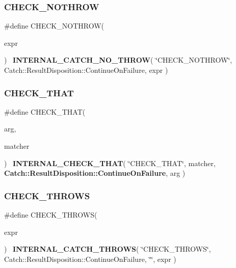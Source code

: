 \mbox{\label{catch_8hpp_a6c1cf3811206fc694cbba31364b61d87}} 
\subsubsection{C\+H\+E\+C\+K\+\_\+\+N\+O\+T\+H\+R\+OW}
{\footnotesize\ttfamily \#define C\+H\+E\+C\+K\+\_\+\+N\+O\+T\+H\+R\+OW(\begin{DoxyParamCaption}\item[{}]{expr }\end{DoxyParamCaption})~\textbf{ I\+N\+T\+E\+R\+N\+A\+L\+\_\+\+C\+A\+T\+C\+H\+\_\+\+N\+O\+\_\+\+T\+H\+R\+OW}( \char`\"{}C\+H\+E\+C\+K\+\_\+\+N\+O\+T\+H\+R\+OW\char`\"{}, Catch\+::\+Result\+Disposition\+::\+Continue\+On\+Failure, expr )}

\mbox{\label{catch_8hpp_a5b8c33c63e0804d4458e2c761370b75d}} 
\subsubsection{C\+H\+E\+C\+K\+\_\+\+T\+H\+AT}
{\footnotesize\ttfamily \#define C\+H\+E\+C\+K\+\_\+\+T\+H\+AT(\begin{DoxyParamCaption}\item[{}]{arg,  }\item[{}]{matcher }\end{DoxyParamCaption})~\textbf{ I\+N\+T\+E\+R\+N\+A\+L\+\_\+\+C\+H\+E\+C\+K\+\_\+\+T\+H\+AT}( \char`\"{}C\+H\+E\+C\+K\+\_\+\+T\+H\+AT\char`\"{}, matcher, \textbf{ Catch\+::\+Result\+Disposition\+::\+Continue\+On\+Failure}, arg )}

\mbox{\label{catch_8hpp_ab35bfeeeae3c3cb223f550f1d6e9a396}} 
\subsubsection{C\+H\+E\+C\+K\+\_\+\+T\+H\+R\+O\+WS}
{\footnotesize\ttfamily \#define C\+H\+E\+C\+K\+\_\+\+T\+H\+R\+O\+WS(\begin{DoxyParamCaption}\item[{}]{expr }\end{DoxyParamCaption})~\textbf{ I\+N\+T\+E\+R\+N\+A\+L\+\_\+\+C\+A\+T\+C\+H\+\_\+\+T\+H\+R\+O\+WS}( \char`\"{}C\+H\+E\+C\+K\+\_\+\+T\+H\+R\+O\+WS\char`\"{}, Catch\+::\+Result\+Disposition\+::\+Continue\+On\+Failure, \char`\"{}\char`\"{}, expr )}


